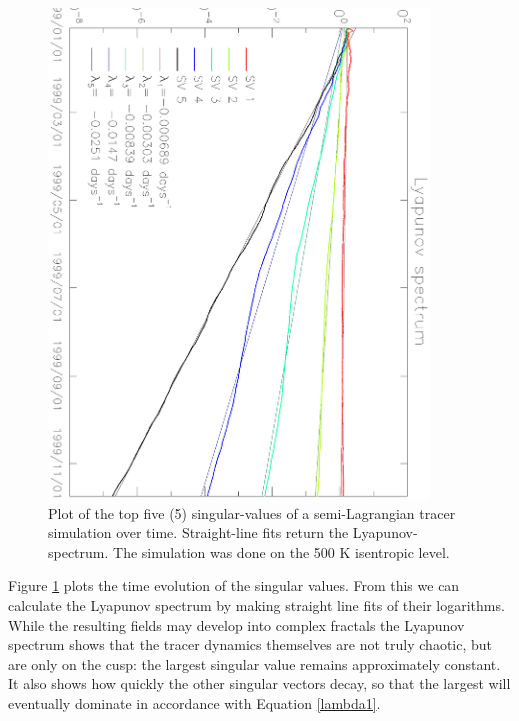 \documentclass{article}
\begin{document}
\label{Lyapunov_exponents}

\begin{figure}
\begin{center}
\includegraphics[angle=90,width=0.9\textwidth]{../pc_proxy/lyap_spec.eps}
\caption{Plot of the top five (5) singular-values of a semi-Lagrangian
tracer simulation over time.  Straight-line fits return the Lyapunov-spectrum.
The simulation was done on the 500 K isentropic level.}
\label{lyap_spec}
\end{center}
\end{figure}

Figure \ref{lyap_spec} plots the time evolution of the singular values.
From this we can calculate the Lyapunov spectrum by making straight line
fits of their logarithms.
While the resulting fields may develop into complex fractals \citep{Mills2009}
the Lyapunov spectrum shows that the tracer dynamics themselves 
are not truly chaotic, but are
only on the cusp: the largest singular value remains approximately constant.
It also shows how quickly the other singular vectors decay,
so that the largest will eventually dominate in accordance with
Equation \ref{lambda1}.
\end{document}
